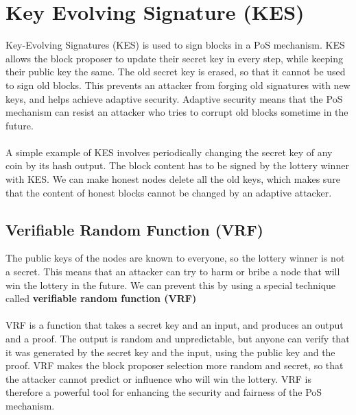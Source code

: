\section{Key Evolving Signature (KES)}
Key-Evolving Signatures (KES) is used to sign blocks in a PoS mechanism. KES allows the block proposer to update their secret key in every step, while keeping their public key the same. The old secret key is erased, so that it cannot be used to sign old blocks. This prevents an attacker from forging old signatures with new keys, and helps achieve adaptive security. Adaptive security means that the PoS mechanism can resist an attacker who tries to corrupt old blocks sometime in the future.\\\\
A simple example of KES involves periodically changing the secret key of any coin by its hash output. The block content has to be signed by the lottery winner with KES. We can make honest nodes delete all the old keys, which makes sure that the content of honest blocks cannot be changed by an adaptive attacker.

\subsection*{Verifiable Random Function (VRF)}
The public keys of the nodes are known to everyone, so the lottery winner is not a secret. This means that an attacker can try to harm or bribe a node that will win the lottery in the future. We can prevent this by using a special technique called \textbf{verifiable random function (VRF)}\\\\
VRF is a function that takes a secret key and an input, and produces an output and a proof. The output is random and unpredictable, but anyone can verify that it was generated by the secret key and the input, using the public key and the proof.
VRF makes the block proposer selection more random and secret, so that the attacker cannot predict or influence who will win the lottery. VRF is therefore a powerful tool for enhancing the security and fairness of the PoS mechanism.

